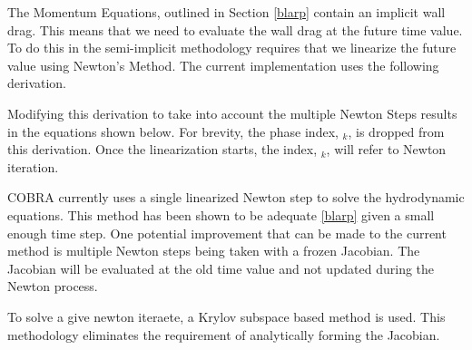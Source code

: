 The Momentum Equations, outlined in Section \ref{blarp} contain an implicit wall drag. This means that we need to evaluate the wall drag at the future time value.
To do this in the semi-implicit methodology requires that we linearize the future value using Newton's Method.
The current implementation uses the following derivation.

Modifying this derivation to take into account the multiple Newton Steps results in the equations shown below.
For brevity, the phase index, $_k$, is dropped from this derivation.
Once the linearization starts, the index, $_k$, will refer to Newton iteration.



COBRA currently uses a single linearized Newton step to solve the hydrodynamic equations.
This method has been shown to be adequate \ref{blarp} given a small enough time step.
One potential improvement that can be made to the current method is multiple Newton steps being taken with a frozen Jacobian.
The Jacobian will be evaluated at the old time value and not updated during the Newton process.


To solve a give newton iteraete, a Krylov subspace based method is used.
This methodology eliminates the requirement of analytically forming the Jacobian.